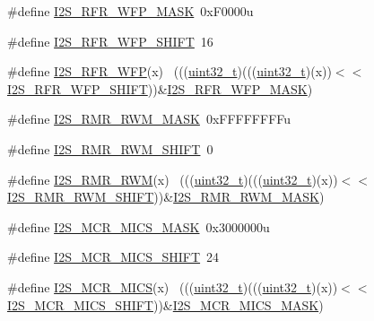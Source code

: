 \begin{DoxyCompactItemize}
\item 
\#define \hyperlink{group___i2_s___register___masks_ga14ca8fb387a14c562c2721c054f25acc}{I2\+S\+\_\+\+R\+F\+R\+\_\+\+W\+F\+P\+\_\+\+M\+A\+SK}~0x\+F0000u
\item 
\#define \hyperlink{group___i2_s___register___masks_ga1890bc961298234e8516b19b4523bfb5}{I2\+S\+\_\+\+R\+F\+R\+\_\+\+W\+F\+P\+\_\+\+S\+H\+I\+FT}~16
\item 
\#define \hyperlink{group___i2_s___register___masks_gaeea13d7abeeb75eda8456fd9f33d918a}{I2\+S\+\_\+\+R\+F\+R\+\_\+\+W\+FP}(x)                                                  ~(((\hyperlink{_p_e___types_8h_a33594304e786b158f3fb30289278f5af}{uint32\+\_\+t})(((\hyperlink{_p_e___types_8h_a33594304e786b158f3fb30289278f5af}{uint32\+\_\+t})(x))$<$$<$\hyperlink{group___i2_s___register___masks_ga1890bc961298234e8516b19b4523bfb5}{I2\+S\+\_\+\+R\+F\+R\+\_\+\+W\+F\+P\+\_\+\+S\+H\+I\+FT}))\&\hyperlink{group___i2_s___register___masks_ga14ca8fb387a14c562c2721c054f25acc}{I2\+S\+\_\+\+R\+F\+R\+\_\+\+W\+F\+P\+\_\+\+M\+A\+SK})
\item 
\#define \hyperlink{group___i2_s___register___masks_ga72f2c1e6c8be00aa0227c8d924c3506a}{I2\+S\+\_\+\+R\+M\+R\+\_\+\+R\+W\+M\+\_\+\+M\+A\+SK}~0x\+F\+F\+F\+F\+F\+F\+F\+Fu
\item 
\#define \hyperlink{group___i2_s___register___masks_gaf69010ae59c583206d59a8cc0c681c04}{I2\+S\+\_\+\+R\+M\+R\+\_\+\+R\+W\+M\+\_\+\+S\+H\+I\+FT}~0
\item 
\#define \hyperlink{group___i2_s___register___masks_ga7ba1c2c5eed2f45b4ffd6dc887628801}{I2\+S\+\_\+\+R\+M\+R\+\_\+\+R\+WM}(x)                                                  ~(((\hyperlink{_p_e___types_8h_a33594304e786b158f3fb30289278f5af}{uint32\+\_\+t})(((\hyperlink{_p_e___types_8h_a33594304e786b158f3fb30289278f5af}{uint32\+\_\+t})(x))$<$$<$\hyperlink{group___i2_s___register___masks_gaf69010ae59c583206d59a8cc0c681c04}{I2\+S\+\_\+\+R\+M\+R\+\_\+\+R\+W\+M\+\_\+\+S\+H\+I\+FT}))\&\hyperlink{group___i2_s___register___masks_ga72f2c1e6c8be00aa0227c8d924c3506a}{I2\+S\+\_\+\+R\+M\+R\+\_\+\+R\+W\+M\+\_\+\+M\+A\+SK})
\item 
\#define \hyperlink{group___i2_s___register___masks_ga4c26e3cecbf702523474909a853e29b8}{I2\+S\+\_\+\+M\+C\+R\+\_\+\+M\+I\+C\+S\+\_\+\+M\+A\+SK}~0x3000000u
\item 
\#define \hyperlink{group___i2_s___register___masks_gabf7e721def09b1b0b95908cfafe51512}{I2\+S\+\_\+\+M\+C\+R\+\_\+\+M\+I\+C\+S\+\_\+\+S\+H\+I\+FT}~24
\item 
\#define \hyperlink{group___i2_s___register___masks_ga2504ccb253f4d41c8a32c3cdeb372ff3}{I2\+S\+\_\+\+M\+C\+R\+\_\+\+M\+I\+CS}(x)                                                ~(((\hyperlink{_p_e___types_8h_a33594304e786b158f3fb30289278f5af}{uint32\+\_\+t})(((\hyperlink{_p_e___types_8h_a33594304e786b158f3fb30289278f5af}{uint32\+\_\+t})(x))$<$$<$\hyperlink{group___i2_s___register___masks_gabf7e721def09b1b0b95908cfafe51512}{I2\+S\+\_\+\+M\+C\+R\+\_\+\+M\+I\+C\+S\+\_\+\+S\+H\+I\+FT}))\&\hyperlink{group___i2_s___register___masks_ga4c26e3cecbf702523474909a853e29b8}{I2\+S\+\_\+\+M\+C\+R\+\_\+\+M\+I\+C\+S\+\_\+\+M\+A\+SK})
$$
\end{DoxyCompactItemize}
